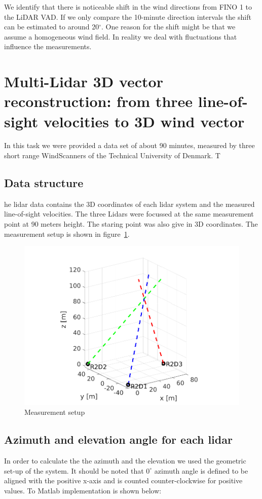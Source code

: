 \documentclass[10pt]{article}
\begin{document}
We identify that there is noticeable shift in the wind directions from FINO 1 to the LiDAR VAD. If we only compare the 10-minute direction intervals the shift can be estimated to around 20$^\circ$. One reason for the shift might be that we assume a homogeneous wind field. In reality we deal with fluctuations that influence the measurements. 

\section{Multi-Lidar 3D vector reconstruction: from three line-of-sight velocities to 3D wind vector}
In this task we were provided a data set of about 90 minutes, measured by three short range WindScanners of the Technical University of Denmark. T
\subsection{Data structure}
he lidar data contains the 3D coordinates of each lidar system and the measured line-of-sight velocities. The three Lidars were focussed at the same measurement point at 90 meters height. The staring point was also give in 3D coordinates.
 The measurement setup is shown in figure~\ref{fig:measurementsetup}.

\begin{figure}[H]
\includegraphics[width=1\linewidth]{../Exercises_and_Tasks/lidar.png}
\caption{Measurement setup}
\label{fig:measurementsetup}
\end{figure}
\subsection{Azimuth and elevation angle for each lidar}
In order to calculate the the azimuth and the elevation we used the geometric set-up of the system.
It should be noted that $0^\circ$ azimuth angle is defined to be aligned with the positive x-axis and is counted counter-clockwise for positive values. 
To Matlab implementation is shown below:\\
\end{document}

